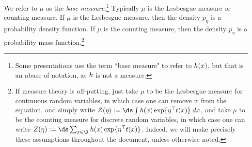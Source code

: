 \begin{definition}
We refer to $\mu$ as the \textit{base measure}.\footnote{Some presentations use the term ``base measure" to refer to $h(x)$, but that is an abuse of notation, as $h$ is not a measure.}  Typically $\mu$ is the Lesbesgue measure or counting measure.  If $\mu$ is the Lesbesgue measure, then the density $p_\eta$ is a probability density function.  If $\mu$ is the counting measure, then the density $p_\eta$ is a probability mass function.\footnote{If measure theory is off-putting, just take $\mu$ to be the Lesbesgue measure for continuous random variables, in which case one can remove it from the equation, and simply write $Z(\eta) := \ds\int  \carrierDensity(x) \exp \{ \eta^\top \sufficientStatsFunction (x)  \} \; dx $, and take $\mu$ to be the counting measure for discrete random variables, in which case one can write $Z(\eta) := \ds\sum_{x \in \X} \carrierDensity(x) \exp \{ \eta^\top \sufficientStatsFunction(x)  \} $. Indeed, we will make precisely these assumptions throughout the document, unless otherwise noted. }  %
\label{def:exponential_family}
\end{definition} 
